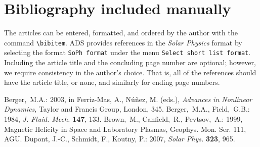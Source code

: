 \documentclass[namedreferences]{solarphysics}
\newcommand{\solphys}{{\it Solar Phys.}}
\begin{document}
\begin{article}



 {\typeout{}
\typeout{****************************************************}
\typeout{****************************************************}
  
\typeout{****************************************************}
\typeout{****************************************************}
\typeout{}}

\section*{Bibliography included manually }
  The articles can be entered, formatted, and ordered  
by the author with the command \verb+\bibitem+.  ADS provides
references in the {\it Solar Physics} format by selecting
the format \verb+SoPh format+ under the menu 
\verb+Select short list format+.    Including the article title
and the concluding page number are optional;
however, we require consistency in the author's choice.
That is, all of the references should have the article title, or none,
and similarly for ending page numbers.

\begin{thebibliography}{}
Berger,~M.A.: 
2003, in Ferriz-Mas, A., N{\'u}{\~n}ez, M. (eds.),
    \textit{Advances in Nonlinear Dynamics}, Taylor and Francis Group, 
    London, 345.
Berger,~M.A., Field,~G.B.: 
1984, \textit{J. Fluid. Mech.} \textbf{147}, 133.
Brown,~M., Canfield,~R., Pevtsov,~A.:
1999, Magnetic Helicity in Space and Laboratory Plasmas, Geophys. Mon. 
      Ser. 111, AGU.
Dupont, J.-C., Schmidt, F., Koutny, P.: 2007, \solphys{} \textbf{323}, 965. 
\end{thebibliography}

\end{article} 
\end{document}
